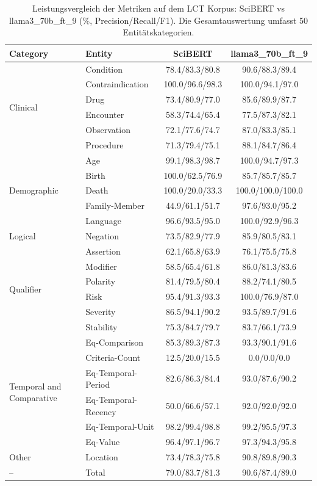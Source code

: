
\begin{table}[htbp]
\centering
\begin{tabular}{llcc}
\toprule
\textbf{Category} & \textbf{Entity} & \textbf{SciBERT} & \textbf{llama3_70b_ft_9} \\
\midrule
\multirow{6}{*}{Clinical} & Condition & 78.4/83.3/80.8 & 90.6/88.3/89.4 \\
 & Contraindication & 100.0/96.6/98.3 & 100.0/94.1/97.0 \\
 & Drug & 73.4/80.9/77.0 & 85.6/89.9/87.7 \\
 & Encounter & 58.3/74.4/65.4 & 77.5/87.3/82.1 \\
 & Observation & 72.1/77.6/74.7 & 87.0/83.3/85.1 \\
 & Procedure & 71.3/79.4/75.1 & 88.1/84.7/86.4 \\
\midrule
\multirow{5}{*}{Demographic} & Age & 99.1/98.3/98.7 & 100.0/94.7/97.3 \\
 & Birth & 100.0/62.5/76.9 & 85.7/85.7/85.7 \\
 & Death & 100.0/20.0/33.3 & 100.0/100.0/100.0 \\
 & Family-Member & 44.9/61.1/51.7 & 97.6/93.0/95.2 \\
 & Language & 96.6/93.5/95.0 & 100.0/92.9/96.3 \\
\midrule
Logical & Negation & 73.5/82.9/77.9 & 85.9/80.5/83.1 \\
\midrule
\multirow{6}{*}{Qualifier} & Assertion & 62.1/65.8/63.9 & 76.1/75.5/75.8 \\
 & Modifier & 58.5/65.4/61.8 & 86.0/81.3/83.6 \\
 & Polarity & 81.4/79.5/80.4 & 88.2/74.1/80.5 \\
 & Risk & 95.4/91.3/93.3 & 100.0/76.9/87.0 \\
 & Severity & 86.5/94.1/90.2 & 93.5/89.7/91.6 \\
 & Stability & 75.3/84.7/79.7 & 83.7/66.1/73.9 \\
\midrule
\multirow{6}{*}{Temporal and Comparative} & Eq-Comparison & 85.3/89.3/87.3 & 93.3/90.1/91.6 \\
 & Criteria-Count & 12.5/20.0/15.5 & 0.0/0.0/0.0 \\
 & Eq-Temporal-Period & 82.6/86.3/84.4 & 93.0/87.6/90.2 \\
 & Eq-Temporal-Recency & 50.0/66.6/57.1 & 92.0/92.0/92.0 \\
 & Eq-Temporal-Unit & 98.2/99.4/98.8 & 99.2/95.5/97.3 \\
 & Eq-Value & 96.4/97.1/96.7 & 97.3/94.3/95.8 \\
\midrule
Other & Location & 73.4/78.3/75.8 & 90.8/89.8/90.3 \\
\midrule
-- & Total & 79.0/83.7/81.3 & 90.6/87.4/89.0 \\
\bottomrule
\end{tabular}
\caption{Leistungsvergleich der Metriken auf dem LCT Korpus: SciBERT vs llama3_70b_ft_9 (\%, Precision/Recall/F1). Die Gesamtauswertung umfasst 50 Entitätskategorien.}
\label{tab:metrics_comparison}
\end{table}
    